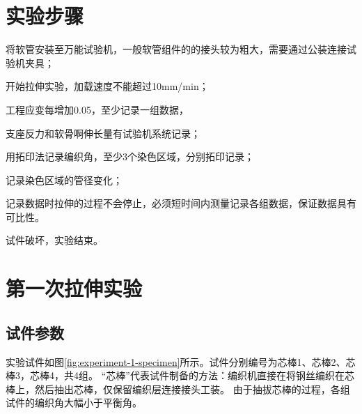 \begin{figure}[!htb]
	\centering
	\hspace{1cm}

	\label{fig:experiment}
\end{figure}



\section{实验步骤}

\begin{compactenum}
	\item 将软管安装至万能试验机，一般软管组件的的接头较为粗大，需要通过公装连接试验机夹具；
	\item 开始拉伸实验，加载速度不能超过10mm/min；
	\item 工程应变每增加0.05，至少记录一组数据，
	\begin{compactitem}
		\item 支座反力和软骨啊伸长量有试验机系统记录；
		\item 用拓印法记录编织角，至少3个染色区域，分别拓印记录；
		\item 记录染色区域的管径变化；
		\item 记录数据时拉伸的过程不会停止，必须短时间内测量记录各组数据，保证数据具有可比性。
	\end{compactitem}
	\item 试件破坏，实验结束。
\end{compactenum}





\section{第一次拉伸实验}
\subsection{试件参数}
 实验试件如图\ref{fig:experiment-1-specimen}所示。试件分别编号为芯棒1、芯棒2、芯棒3，芯棒4，共4组。
 “芯棒”代表试件制备的方法：编织机直接在将钢丝编织在芯棒上，然后抽出芯棒，仅保留编织层连接接头工装。
由于抽拔芯棒的过程，各组试件的编织角大幅小于平衡角。



